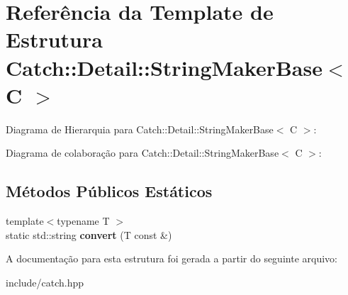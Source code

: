 \hypertarget{structCatch_1_1Detail_1_1StringMakerBase}{}\section{Referência da Template de Estrutura Catch\+:\+:Detail\+:\+:String\+Maker\+Base$<$ C $>$}
\label{structCatch_1_1Detail_1_1StringMakerBase}


Diagrama de Hierarquia para Catch\+:\+:Detail\+:\+:String\+Maker\+Base$<$ C $>$\+:


Diagrama de colaboração para Catch\+:\+:Detail\+:\+:String\+Maker\+Base$<$ C $>$\+:
\subsection*{Métodos Públicos Estáticos}
\begin{DoxyCompactItemize}
\item 
{\footnotesize template$<$typename T $>$ }\\static std\+::string {\bfseries convert} (T const \&)\hypertarget{structCatch_1_1Detail_1_1StringMakerBase_a8eb9f635dc413a5758e22614bafaf1a3}{}\label{structCatch_1_1Detail_1_1StringMakerBase_a8eb9f635dc413a5758e22614bafaf1a3}

\end{DoxyCompactItemize}


A documentação para esta estrutura foi gerada a partir do seguinte arquivo\+:\begin{DoxyCompactItemize}
\item 
include/catch.\+hpp\end{DoxyCompactItemize}
